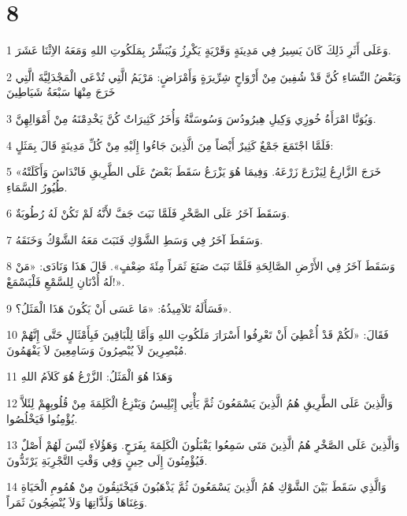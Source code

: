 \chapter{8}

\par 1 وَعَلَى أَثَرِ ذَلِكَ كَانَ يَسِيرُ فِي مَدِينَةٍ وَقَرْيَةٍ يَكْرِزُ وَيُبَشِّرُ بِمَلَكُوتِ اللهِ وَمَعَهُ الاِثْنَا عَشَرَ.
\par 2 وَبَعْضُ النِّسَاءِ كُنَّ قَدْ شُفِينَ مِنْ أَرْوَاحٍ شِرِّيرَةٍ وَأَمْرَاضٍ: مَرْيَمُ الَّتِي تُدْعَى الْمَجْدَلِيَّةَ الَّتِي خَرَجَ مِنْهَا سَبْعَةُ شَيَاطِينَ
\par 3 وَيُوَنَّا امْرَأَةُ خُوزِي وَكِيلِ هِيرُودُسَ وَسُوسَنَّةُ وَأُخَرُ كَثِيرَاتٌ كُنَّ يَخْدِمْنَهُ مِنْ أَمْوَالِهِنَّ.
\par 4 فَلَمَّا اجْتَمَعَ جَمْعٌ كَثِيرٌ أَيْضاً مِنَ الَّذِينَ جَاءُوا إِلَيْهِ مِنْ كُلِّ مَدِينَةٍ قَالَ بِمَثَلٍ:
\par 5 «خَرَجَ الزَّارِعُ لِيَزْرَعَ زَرْعَهُ. وَفِيمَا هُوَ يَزْرَعُ سَقَطَ بَعْضٌ عَلَى الطَّرِيقِ فَانْدَاسَ وَأَكَلَتْهُ طُيُورُ السَّمَاءِ.
\par 6 وَسَقَطَ آخَرُ عَلَى الصَّخْرِ فَلَمَّا نَبَتَ جَفَّ لأَنَّهُ لَمْ تَكُنْ لَهُ رُطُوبَةٌ.
\par 7 وَسَقَطَ آخَرُ فِي وَسَطِ الشَّوْكِ فَنَبَتَ مَعَهُ الشَّوْكُ وَخَنَقَهُ.
\par 8 وَسَقَطَ آخَرُ فِي الأَرْضِ الصَّالِحَةِ فَلَمَّا نَبَتَ صَنَعَ ثَمَراً مِئَةَ ضِعْفٍ». قَالَ هَذَا وَنَادَى: «مَنْ لَهُ أُذْنَانِ لِلسَّمْعِ فَلْيَسْمَعْ!».
\par 9 فَسَأَلَهُ تَلاَمِيذُهُ: «مَا عَسَى أَنْ يَكُونَ هَذَا الْمَثَلُ؟».
\par 10 فَقَالَ: «لَكُمْ قَدْ أُعْطِيَ أَنْ تَعْرِفُوا أَسْرَارَ مَلَكُوتِ اللهِ وَأَمَّا لِلْبَاقِينَ فَبِأَمْثَالٍ حَتَّى إِنَّهُمْ مُبْصِرِينَ لاَ يُبْصِرُونَ وَسَامِعِينَ لاَ يَفْهَمُونَ.
\par 11 وَهَذَا هُوَ الْمَثَلُ: الزَّرْعُ هُوَ كَلاَمُ اللهِ
\par 12 وَالَّذِينَ عَلَى الطَّرِيقِ هُمُ الَّذِينَ يَسْمَعُونَ ثُمَّ يَأْتِي إِبْلِيسُ وَيَنْزِعُ الْكَلِمَةَ مِنْ قُلُوبِهِمْ لِئَلاَّ يُؤْمِنُوا فَيَخْلُصُوا.
\par 13 وَالَّذِينَ عَلَى الصَّخْرِ هُمُ الَّذِينَ مَتَى سَمِعُوا يَقْبَلُونَ الْكَلِمَةَ بِفَرَحٍ. وَهَؤُلاَءِ لَيْسَ لَهُمْ أَصْلٌ فَيُؤْمِنُونَ إِلَى حِينٍ وَفِي وَقْتِ التَّجْرِبَةِ يَرْتَدُّونَ.
\par 14 وَالَّذِي سَقَطَ بَيْنَ الشَّوْكِ هُمُ الَّذِينَ يَسْمَعُونَ ثُمَّ يَذْهَبُونَ فَيَخْتَنِقُونَ مِنْ هُمُومِ الْحَيَاةِ وَغِنَاهَا وَلَذَّاتِهَا وَلاَ يُنْضِجُونَ ثَمَراً.
